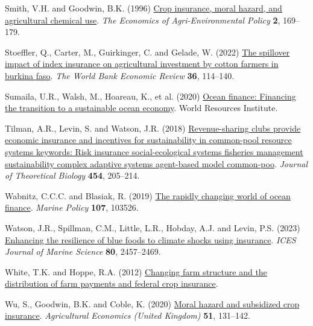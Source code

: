 \documentclass[
  letterpaper,
  DIV=11,
  numbers=noendperiod]{scrartcl}
\newlength{\cslhangindent}
\newenvironment{CSLReferences}[2] %
 {\begin{list}{}{%
  \setlength{\itemindent}{0pt}
  \setlength{\leftmargin}{0pt}
  \setlength{\parsep}{0pt}
  \ifodd #1
   \setlength{\leftmargin}{\cslhangindent}
   \setlength{\itemindent}{-1\cslhangindent}
  \fi
  \setlength{\itemsep}{#2\baselineskip}}}
 {\end{list}}
\theoremstyle{plain}
\theoremstyle{plain}
\theoremstyle{remark}
\begin{document}
\begin{CSLReferences}{1}{0}
Smith, V.H. and Goodwin, B.K. (1996)
\href{https://doi.org/10.2307/1243714}{Crop insurance, moral hazard, and
agricultural chemical use}. \emph{The Economics of Agri-Environmental
Policy} \textbf{2}, 169--179.

Stoeffler, Q., Carter, M., Guirkinger, C. and Gelade, W. (2022)
\href{https://doi.org/10.1093/wber}{The spillover impact of index
insurance on agricultural investment by cotton farmers in burkina faso}.
\emph{The World Bank Economic Review} \textbf{36}, 114--140.

Sumaila, U.R., Walsh, M., Hoareau, K., et al. (2020)
\href{https://www.oceanpanel.org/blue-}{Ocean finance: Financing the
transition to a sustainable ocean economy}. World Resources Institute.

Tilman, A.R., Levin, S. and Watson, J.R. (2018)
\href{https://doi.org/10.1016/j.jtbi.2018.06.003}{Revenue-sharing clubs
provide economic insurance and incentives for sustainability in
common-pool resource systems keywords: Risk insurance social-ecological
systems fisheries management sustainability complex adaptive systems
agent-based model common-poo}. \emph{Journal of Theoretical Biology}
\textbf{454}, 205--214.

Wabnitz, C.C.C. and Blasiak, R. (2019)
\href{https://doi.org/10.1016/j.marpol.2019.103526}{The rapidly changing
world of ocean finance}. \emph{Marine Policy} \textbf{107}, 103526.

Watson, J.R., Spillman, C.M., Little, L.R., Hobday, A.J. and Levin, P.S.
(2023) \href{https://doi.org/10.1093/icesjms/fsad175}{Enhancing the
resilience of blue foods to climate shocks using insurance}. \emph{ICES
Journal of Marine Science} \textbf{80}, 2457--2469.

White, T.K. and Hoppe, R.A. (2012)
\href{https://www.ers.usda.gov}{Changing farm structure and the
distribution of farm payments and federal crop insurance}.

Wu, S., Goodwin, B.K. and Coble, K. (2020)
\href{https://doi.org/10.1111/agec.12545}{Moral hazard and subsidized
crop insurance}. \emph{Agricultural Economics (United Kingdom)}
\textbf{51}, 131--142.

\end{CSLReferences}
\end{document}

